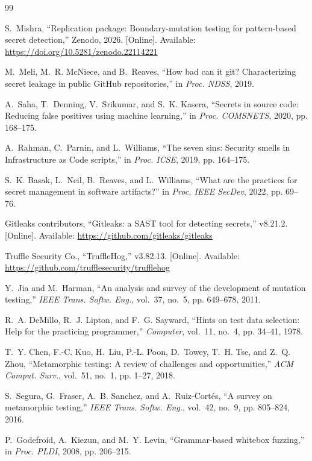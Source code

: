 \documentclass[journal]{IEEEtran}
\begin{document}
\begin{thebibliography}{99}\footnotesize

 S.~Mishra, ``Replication package: Boundary-mutation testing for pattern-based secret detection,'' Zenodo, 2026. [Online]. Available: \url{https://doi.org/10.5281/zenodo.22114221}

 M.~Meli, M.~R. McNiece, and B.~Reaves, ``How bad can it git? Characterizing secret leakage in public GitHub repositories,'' in \emph{Proc. NDSS}, 2019.

 A.~Saha, T.~Denning, V.~Srikumar, and S.~K. Kasera, ``Secrets in source code: Reducing false positives using machine learning,'' in \emph{Proc. COMSNETS}, 2020, pp. 168--175.

 A.~Rahman, C.~Parnin, and L.~Williams, ``The seven sins: Security smells in Infrastructure as Code scripts,'' in \emph{Proc. ICSE}, 2019, pp. 164--175.

 S.~K. Basak, L.~Neil, B.~Reaves, and L.~Williams, ``What are the practices for secret management in software artifacts?'' in \emph{Proc. IEEE SecDev}, 2022, pp. 69--76.

 Gitleaks contributors, ``Gitleaks: a SAST tool for detecting secrets,'' v8.21.2. [Online]. Available: \url{https://github.com/gitleaks/gitleaks}

 Truffle Security Co., ``TruffleHog,'' v3.82.13. [Online]. Available: \url{https://github.com/trufflesecurity/trufflehog}

 Y.~Jia and M.~Harman, ``An analysis and survey of the development of mutation testing,'' \emph{IEEE Trans. Softw. Eng.}, vol.~37, no.~5, pp. 649--678, 2011.

 R.~A. DeMillo, R.~J. Lipton, and F.~G. Sayward, ``Hints on test data selection: Help for the practicing programmer,'' \emph{Computer}, vol.~11, no.~4, pp. 34--41, 1978.

 T.~Y. Chen, F.-C. Kuo, H.~Liu, P.-L. Poon, D.~Towey, T.~H. Tse, and Z.~Q. Zhou, ``Metamorphic testing: A review of challenges and opportunities,'' \emph{ACM Comput. Surv.}, vol.~51, no.~1, pp. 1--27, 2018.

 S.~Segura, G.~Fraser, A.~B. Sanchez, and A.~Ruiz-Cortés, ``A survey on metamorphic testing,'' \emph{IEEE Trans. Softw. Eng.}, vol.~42, no.~9, pp. 805--824, 2016.

 P.~Godefroid, A.~Kiezun, and M.~Y. Levin, ``Grammar-based whitebox fuzzing,'' in \emph{Proc. PLDI}, 2008, pp. 206--215.


\end{thebibliography}
\end{document}
